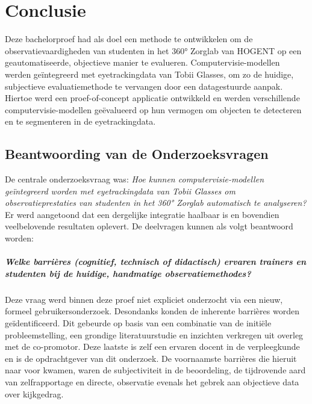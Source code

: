 
\chapter{Conclusie}%
\label{ch:conclusie}



Deze bachelorproef had als doel een methode te ontwikkelen om de observatievaardigheden van 
studenten in het 360° Zorglab van HOGENT op een geautomatiseerde, objectieve manier te evalueren.
Computervisie-modellen werden geïntegreerd met eyetrackingdata van Tobii Glasses, om zo de huidige, 
subjectieve evaluatiemethode te vervangen door een datagestuurde aanpak.
Hiertoe werd een proef-of-concept applicatie ontwikkeld en werden verschillende computervisie-modellen 
geëvalueerd op hun vermogen om objecten te detecteren en te segmenteren in de eyetrackingdata.

\section{Beantwoording van de Onderzoeksvragen}

De centrale onderzoeksvraag was: 
\textit{Hoe kunnen computervisie-modellen geïntegreerd worden met eyetrackingdata van Tobii Glasses om observatieprestaties 
van studenten in het 360° Zorglab automatisch te analyseren?}
Er werd aangetoond dat een dergelijke integratie haalbaar is en bovendien veelbelovende resultaten oplevert.
De deelvragen kunnen als volgt beantwoord worden:

\paragraph{\textit{Welke barrières (cognitief, technisch of didactisch) ervaren trainers en studenten bij de huidige, handmatige observatiemethodes?}}
Deze vraag werd binnen deze proef niet expliciet onderzocht via een nieuw, formeel gebruikersonderzoek. 
Desondanks konden de inherente barrières worden geïdentificeerd. 
Dit gebeurde op basis van een combinatie van de initiële probleemstelling, een grondige literatuurstudie en inzichten verkregen uit overleg met de co-promotor. 
Deze laatste is zelf een ervaren docent in de verpleegkunde en is de opdrachtgever van dit onderzoek. 
De voornaamste barrières die hieruit naar voor kwamen, waren de subjectiviteit in de beoordeling, 
de tijdrovende aard van zelfrapportage en directe, observatie evenals het gebrek aan objectieve data over kijkgedrag.  
    
